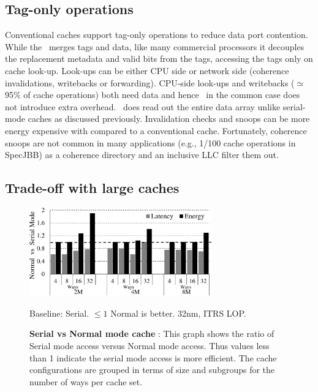 \subsection{Tag-only operations}  

Conventional caches support tag-only operations to reduce data port contention. While the \AC\ merges tags and data, like many commercial processors it decouples the replacement metadata and valid bits from the tags, accessing the tags only on cache look-up. Look-ups can be either CPU side or network side (coherence invalidations, writebacks or forwarding). CPU-side look-ups and writebacks ($\simeq$ 95\% of cache operations) both need data and hence \AC\ in the common case does not introduce extra overhead. \AC\ does read out the entire data array unlike serial-mode caches as discussed previously. Invalidation checks and snoops can be more energy expensive with \AC{} compared to a conventional cache. Fortunately, coherence snoops are not common in many applications (e.g., 1/100 cache operations in SpecJBB) as a coherence directory and an inclusive LLC filter them out.


\subsection{Trade-off with large caches} 
\label{sec:tradeoff_with_large_caches} %

\begin{figure}[h] 
\centering
\includegraphics[width=0.7\textwidth]{files/Plots/07-Serial_vs_Normal.pdf}

Baseline: Serial. $\leq1$ Normal is better.  32nm, ITRS  LOP. 
\caption[Serial vs. Normal - Latency and Energy]{\textbf{Serial vs Normal mode cache} : This graph shows the ratio of Serial mode access versus Normal mode access. Thus values less than 1 indicate the serial mode access is more efficient. The cache configurations are grouped in terms of size and subgroups for the number of ways per cache set. }
\label{fig:serial_normal_graph} 
\end{figure}

